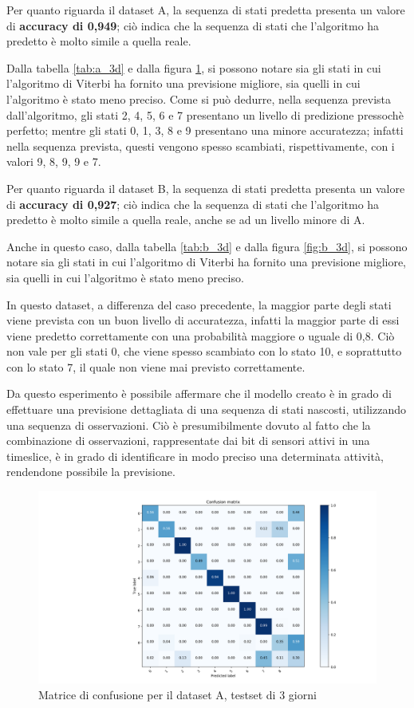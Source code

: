 \documentclass[10pt,a4paper]{article}
\begin{document}
    Per quanto riguarda il dataset A, la sequenza di stati predetta presenta un valore di \textbf{accuracy di 0,949}; ciò indica che la sequenza di stati che l'algoritmo ha predetto è molto simile a quella reale.

    Dalla tabella \ref{tab:a_3d} e dalla figura \ref{fig:a_3d}, si possono notare sia gli stati in cui l'algoritmo di Viterbi ha fornito una previsione migliore, sia quelli in cui l'algoritmo è stato meno preciso. Come si può dedurre, nella sequenza prevista dall'algoritmo, gli stati 2, 4, 5, 6 e 7 presentano un livello di predizione pressochè perfetto; mentre gli stati 0, 1, 3, 8 e 9 presentano una minore accuratezza; infatti nella sequenza prevista, questi vengono spesso scambiati, rispettivamente, con i valori 9, 8, 9, 9 e 7.

    Per quanto riguarda il dataset B, la sequenza di stati predetta presenta un valore di \textbf{accuracy di 0,927}; ciò indica che la sequenza di stati che l'algoritmo ha predetto è molto simile a quella reale, anche se ad un livello minore di A.

    Anche in questo caso, dalla tabella \ref{tab:b_3d} e dalla figura \ref{fig:b_3d}, si possono notare sia gli stati in cui l'algoritmo di Viterbi ha fornito una previsione migliore, sia quelli in cui l'algoritmo è stato meno preciso.

    In questo dataset, a differenza del caso precedente, la maggior parte degli stati viene prevista con un buon livello di accuratezza, infatti la maggior parte di essi viene predetto correttamente con una probabilità maggiore o uguale di 0,8. Ciò non vale per gli stati 0, che viene spesso scambiato con lo stato 10, e soprattutto con lo stato 7, il quale non viene mai previsto correttamente.

    Da questo esperimento è possibile affermare che il modello creato è in grado di effettuare una previsione dettagliata di una sequenza di stati nascosti, utilizzando una sequenza di osservazioni. Ciò è presumibilmente dovuto al fatto che la combinazione di osservazioni, rappresentate dai bit di sensori attivi in una timeslice, è in grado di identificare in modo preciso una determinata attività, rendendone possibile la previsione.

	\begin{figure}[!htbp]
	\includegraphics[width=\linewidth]{immagini/confusion_matrix/a_3d.png}
	\caption{Matrice di confusione per il dataset A, testset di 3 giorni}
	\label{fig:a_3d}
	\end{figure}
\end{document}
